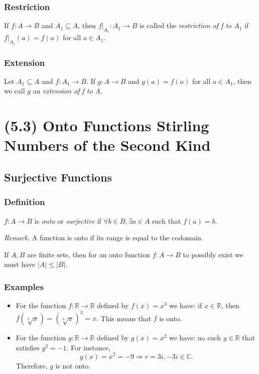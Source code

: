 \documentclass[11pt]{article}
\begin{document}
        \subsubsection{Restriction}

        If \(f: A \rightarrow B\) and \(A_1 \subseteq A\), then \(f |_{A_1} : A_1 \rightarrow B\) is called the \emph{restriction of f to $A_1$} if \(f|_{A_1}(a) = f(a)\) for all \(a \in A_1\).
        
        \subsubsection{Extension}

        Let \(A_1 \subseteq A\) and \(f:A_1 \rightarrow B.\) If \(g:A \rightarrow B\) and \(g(a) = f(a)\) for all \(a \in A_1\), then we call $g$ an \emph{extension of f to A}.

    \section{(5.3) Onto Functions Stirling Numbers of the Second Kind}

    \subsection{Surjective Functions}
    \subsubsection{Definition}

    \(f: A \rightarrow B\) is \emph{onto} or \emph{surjective} if \(\forall b \in B, \exists a \in A\) such that \(f(a)=b.\)

    \vspace{1em}

    \emph{Remark.} A function is onto if its range is equal to the codomain. 

    \vspace{1em}

    If \(A,B\) are finite sets, then for an onto function \(f: A \rightarrow B\) to possibly exist we must have \(|A| \leq |B|\). 

    \subsubsection{Examples}
    \begin{itemize}
        \item For the function \(f: \mathbb{R} \rightarrow \mathbb{R}\) defined by \(f(x)=x^3\) we have: if \(x \in \mathbb{R}\), then \(f(\sqrt[3]x) = (\sqrt[3]x)^3 = x.\) This means that $f$ is onto.
        \item For the function \(g: \mathbb{R} \rightarrow \mathbb{R}\) defined by \(g(x)=x^2\) we have: no such \(y \in \mathbb{R}\) that satisfies \(y^2 = -1.\) For instance, \[g(x) = x^2 = -9 \Rightarrow r = 3i, -3i \in \mathbb{C}.\] Therefore, $g$ is not onto.
    \end{itemize}
\end{document}
